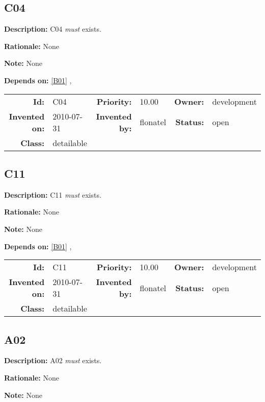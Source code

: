\subsection{C04}\label{C04}
\textbf{Description:} C04 \textsl{must} exists.

\textbf{Rationale:} None

\textbf{Note:} None

\textbf{Depends on:} \ref{B01} , 

\par
{\small \begin{center}\begin{tabular}{rlrlrl}
\textbf{Id:} & C04 & \textbf{Priority:} & 10.00 & \textbf{Owner:} & development \\ 
\textbf{Invented on:} & 2010-07-31 & \textbf{Invented by:} & flonatel & \textbf{Status:} & open \\ 
\textbf{Class:} & detailable & & & & \\ 
\end{tabular}\end{center} }%
\subsection{C11}\label{C11}
\textbf{Description:} C11 \textsl{must} exists.

\textbf{Rationale:} None

\textbf{Note:} None

\textbf{Depends on:} \ref{B01} , 

\par
{\small \begin{center}\begin{tabular}{rlrlrl}
\textbf{Id:} & C11 & \textbf{Priority:} & 10.00 & \textbf{Owner:} & development \\ 
\textbf{Invented on:} & 2010-07-31 & \textbf{Invented by:} & flonatel & \textbf{Status:} & open \\ 
\textbf{Class:} & detailable & & & & \\ 
\end{tabular}\end{center} }%
\subsection{A02}\label{A02}
\textbf{Description:} A02 \textsl{must} exists.

\textbf{Rationale:} None

\textbf{Note:} None

